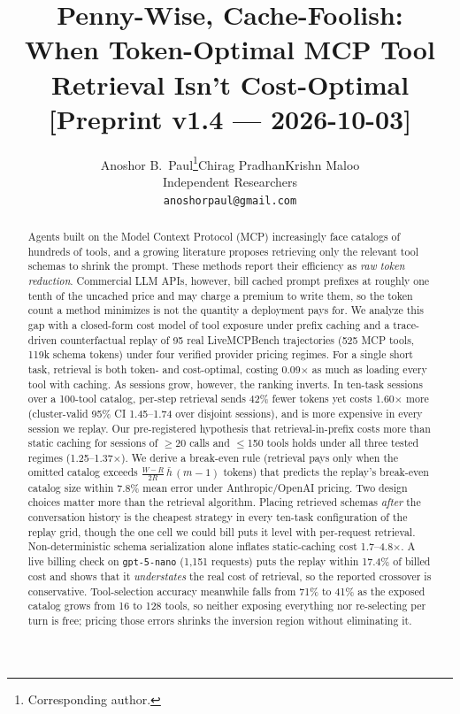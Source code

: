 \documentclass[11pt]{article}
\title{\textbf{Penny-Wise, Cache-Foolish:}\\ When Token-Optimal MCP Tool Retrieval Isn't Cost-Optimal\\[4pt]
\large\normalfont\textcolor{orange!80!black}{[Preprint v1.4 --- 2026-10-03]}}
\author{Anoshor B.\ Paul\thanks{Corresponding author.}\quad Chirag Pradhan\quad Krishn Maloo\\[4pt] Independent Researchers\\ \texttt{anoshorpaul@gmail.com}}
\date{}
\begin{document}
\maketitle

\begin{abstract}
Agents built on the Model Context Protocol (MCP) increasingly face catalogs of hundreds of tools, and a growing literature proposes retrieving only the relevant tool schemas to shrink the prompt. These methods report their efficiency as \emph{raw token reduction}. Commercial LLM APIs, however, bill cached prompt prefixes at roughly one tenth of the uncached price and may charge a premium to write them, so the token count a method minimizes is not the quantity a deployment pays for. We analyze this gap with a closed-form cost model of tool exposure under prefix caching and a trace-driven counterfactual replay of 95 real LiveMCPBench trajectories (525 MCP tools, 119k schema tokens) under four verified provider pricing regimes. For a single short task, retrieval is both token- and cost-optimal, costing 0.09$\times$ as much as loading every tool with caching. As sessions grow, however, the ranking inverts. In ten-task sessions over a 100-tool catalog, per-step retrieval sends 42\% fewer tokens yet costs 1.60$\times$ more (cluster-valid 95\% CI 1.45--1.74 over disjoint sessions), and is more expensive in every session we replay. Our pre-registered hypothesis that retrieval-in-prefix costs more than static caching for sessions of $\geq$20 calls and $\leq$150 tools holds under all three tested regimes (1.25--1.37$\times$). We derive a break-even rule (retrieval pays only when the omitted catalog exceeds $\frac{W-R}{2R}\,\bar h\,(m-1)$ tokens) that predicts the replay's break-even catalog size within 7.8\% mean error under Anthropic/OpenAI pricing. Two design choices matter more than the retrieval algorithm. Placing retrieved schemas \emph{after} the conversation history is the cheapest strategy in every ten-task configuration of the replay grid, though the one cell we could bill puts it level with per-request retrieval. Non-deterministic schema serialization alone inflates static-caching cost 1.7--4.8$\times$. A live billing check on \texttt{gpt-5-nano} (1,151 requests) puts the replay within 17.4\% of billed cost and shows that it \emph{understates} the real cost of retrieval, so the reported crossover is conservative. Tool-selection accuracy meanwhile falls from 71\% to 41\% as the exposed catalog grows from 16 to 128 tools, so neither exposing everything nor re-selecting per turn is free; pricing those errors shrinks the inversion region without eliminating it.
\end{abstract}
\end{document}
